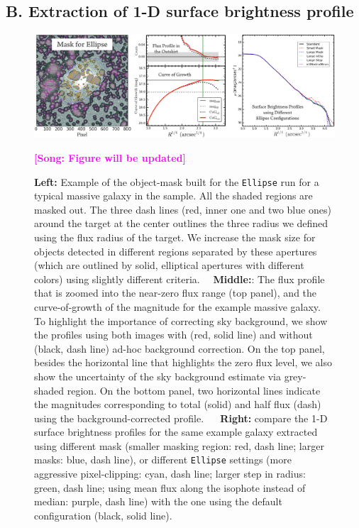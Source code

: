 \documentclass{emulateapj}
\newcommand{\song}[1]{\textcolor{magenta}{\textbf{[Song: #1]}}}
\begin{document}
\begin{CJK*}{UTF8}{gbsn}
\section{B. Extraction of 1-D surface brightness profile} 
    \label{app:A}
    \begin{figure}[hbt!]
        \centering 
        \includegraphics[width=\textwidth]{fig/redbcg_ellipse_tech}
        \caption{\textbf{Left:} Example of the object-mask built for the \texttt{Ellipse}
            run for a typical massive galaxy in the sample. 
            All the shaded regions are masked out. 
            The three dash lines (red, inner one and two blue ones) around the target 
            at the center outlines the three radius we defined using the flux radius 
            of the target.  
            We increase the mask size for objects detected in different regions 
            separated by these apertures (which are outlined by solid, elliptical 
            apertures with different colors) using slightly different criteria.~~
            \textbf{Middle:}: The flux profile that is zoomed into the near-zero flux 
            range (top panel), and the curve-of-growth of the magnitude for the example
            massive galaxy.  
            To highlight the importance of correcting sky background, we show the profiles 
            using both images with (red, solid line) and without (black, dash line) 
            ad-hoc background correction. 
            On the top panel, besides the horizontal line that highlights the zero flux 
            level, we also show the uncertainty of the sky background estimate via 
            grey-shaded region.  
            On the bottom panel, two horizontal lines indicate the magnitudes 
            corresponding to total (solid) and half flux (dash) using the 
            background-corrected profile. ~~
            \textbf{Right:} compare the 1-D surface brightness profiles for the same 
            example galaxy extracted using different mask 
            (smaller masking region: red, dash line; larger masks: blue, dash line), 
            or different \texttt{Ellipse} settings
            (more aggressive pixel-clipping: cyan, dash line; 
             larger step in radius: green, dash line; 
             using mean flux along the isophote instead of median: purple, dash line)
            with the one using the default configuration (black, solid line).}
            \song{Figure will be updated}
        \label{figure:A1}
    \end{figure}


\end{CJK*}
\end{document}
